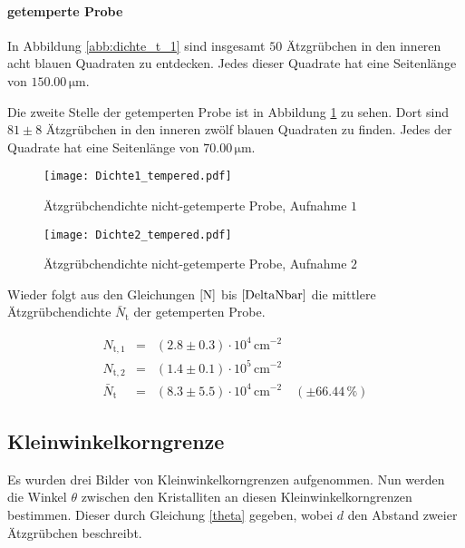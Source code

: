\documentclass[12pt,a4paper]{scrartcl}
\numberwithin{equation}{section} %
\renewcommand{\[}{} %
\renewcommand{\]}{\noindent} %
\begin{document}
\hypertarget{getemperte-probe}{%
\paragraph*{getemperte Probe}\label{getemperte-probe}}

In Abbildung \ref{abb:dichte_t_1} sind insgesamt \(50\) Ätzgrübchen in den inneren
acht blauen Quadraten zu entdecken. Jedes dieser Quadrate hat eine
Seitenlänge von \(150.00 \mathrm{\, \mu m}\).

Die zweite Stelle der getemperten Probe ist in Abbildung \ref{abb:dichte_t_2} zu
sehen. Dort sind \(81\pm8\) Ätzgrübchen in den inneren zwölf blauen
Quadraten zu finden. Jedes der Quadrate hat eine Seitenlänge von
\(70.00 \mathrm{\, \mu m}\).

\begin{figure}[ht]
	\begin{minipage}[t]{.5\linewidth}
		\texttt{[image: Dichte1\_tempered.pdf]}
		\caption{Ätzgrübchendichte nicht-getemperte Probe, Aufnahme $1$}
		\label{abb:dichte_t_1}
	\end{minipage}
	\begin{minipage}[t]{.5\linewidth}
		\texttt{[image: Dichte2\_tempered.pdf]}
		\caption{Ätzgrübchendichte nicht-getemperte Probe, Aufnahme $2$}
		\label{abb:dichte_t_2}
	\end{minipage}
\end{figure}

Wieder folgt aus den Gleichungen \(\eqref{N}\) bis \(\eqref{DeltaNbar}\)
die mittlere Ätzgrübchendichte \(\bar N_\mathrm{t}\) der getemperten
Probe.
\[
\begin{eqnarray}
    N_\mathrm{t,1} &=& (2.8 \pm 0.3) \cdot 10^4 \mathrm{\, cm^{-2}} \\
    N_\mathrm{t,2} &=& (1.4 \pm 0.1) \cdot 10^5 \mathrm{\, cm^{-2}}
    \\
    \bar N_\mathrm{t}
        &=& (8.3 \pm 5.5) \cdot 10^4 \mathrm{\, cm^{-2}}
        \quad(\pm 66.44\,\%)
\end{eqnarray}
\]

\hypertarget{kleinwinkelkorngrenze}{%
\subsection{Kleinwinkelkorngrenze}\label{kleinwinkelkorngrenze}}

Es wurden drei Bilder von Kleinwinkelkorngrenzen aufgenommen. Nun werden die Winkel \(\theta\) zwischen den Kristalliten an diesen
Kleinwinkelkorngrenzen bestimmen. Dieser durch Gleichung
\eqref{theta} gegeben, wobei \(d\) den Abstand zweier Ätzgrübchen
beschreibt.
\end{document}
